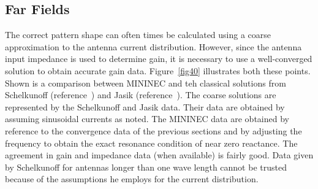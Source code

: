 \documentclass[12pt]{article}
\begin{document}
\subsection{Far Fields}
The correct pattern shape can often times be calculated using a coarse
approximation to the antenna current distribution. However, since the
antenna input impedance is used to determine gain, it is necessary to
use a well-converged solution to obtain accurate gain data.
Figure~\ref{fig40} illustrates both these points. Shown is a comparison
between MININEC and teh classical solutions from Schelkunoff
(reference~\cite{r22}) and Jasik (reference~\cite{r23}). The coarse
solutions are represented by the Schelkunoff and Jasik data. Their data
are obtained by assuming sinusoidal currents as noted. The MININEC data
are obtained by reference to the convergence data of the previous
sections and by adjusting the frequency to obtain the exact resonance
condition of near zero reactance. The agreement in gain and impedance
data (when available) is fairly good. Data given by Schelkunoff for
antennas longer than one wave length cannot be trusted because of the
assumptions he employs for the current distribution.
\end{document}
